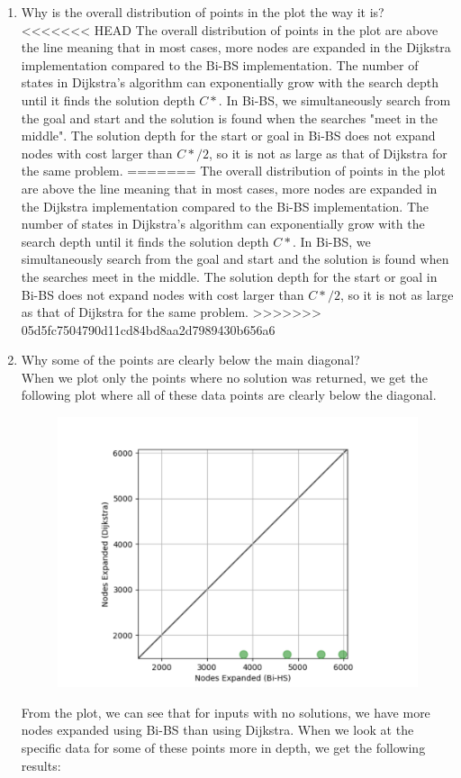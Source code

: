 \documentclass[8pt, letterpaper, titlepage]{article}
\begin{document}
\begin{enumerate}
  \item Why is the overall distribution of points in the plot the way it is?\\
<<<<<<< HEAD
    The overall distribution of points in the plot are above the line meaning that in most cases, more nodes are expanded in the Dijkstra implementation compared to the Bi-BS implementation. The number of states in Dijkstra's algorithm can exponentially grow with the search depth until it finds the solution depth $C*$. In Bi-BS, we simultaneously search from the goal and start and the solution is found when the searches "meet in the middle". The solution depth for the start or goal in Bi-BS does not expand nodes with cost larger than $C*/2$, so it is not as large as that of Dijkstra for the same problem.
=======
    The overall distribution of points in the plot are above the line meaning that in most cases, more nodes are expanded in the Dijkstra implementation compared to the Bi-BS implementation. The number of states in Dijkstra's algorithm can exponentially grow with the search depth until it finds the solution depth $C*$. In Bi-BS, we simultaneously search from the goal and start and the solution is found when the searches meet in the middle. The solution depth for the start or goal in Bi-BS does not expand nodes with cost larger than $C*/2$, so it is not as large as that of Dijkstra for the same problem.
>>>>>>> 05d5fc7504790d11cd84bd8aa2d7989430b656a6
  \item Why some of the points are clearly below the main diagonal?\\
    When we plot only the points where no solution was returned, we get the following plot where all of these data points are clearly below the diagonal. 
  \begin{figure}[H]
    \begin{center}    
      \includegraphics[width=\linewidth*3/6]{image2.png}
    \end{center}
  \end{figure}
  From the plot, we can see that for inputs with no solutions, we have more nodes expanded using Bi-BS than using Dijkstra. When we look at the specific data for some of these points more in depth, we get the following results:


\end{enumerate}
\end{document}
